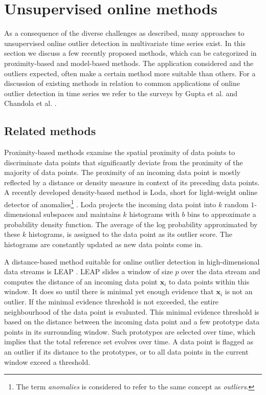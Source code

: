 \section{Unsupervised online methods}

As a consequence of the diverse challenges as described, many approaches to unsupervised online outlier detection in multivariate time series exist. In this section we discuss a few recently proposed methods, which can be categorized in proximity-based and model-based methods. The application considered and the outliers expected, often make a certain method more suitable than others. For a discussion of existing methods in relation to common applications of online outlier detection in time series we refer to the surveys by Gupta et al. \cite{gupta2014outlier} and Chandola et al. \cite{chandola2009anomaly}. 

\subsection{Related methods}
\label{sec:introduction_related}
Proximity-based methods examine the spatial proximity of data points to discriminate data points that significantly deviate from the proximity of the majority of data points. The proximity of an incoming data point is mostly reflected by a distance or density measure in context of its preceding data points.
A recently developed density-based method is Loda, short for light-weight online detector of anomalies\footnote{The term \textit{anomalies} is considered to refer to the same concept as \textit{outliers}.} \cite{pevny2016loda}. Loda projects the incoming data point into $k$ random $1$-dimensional subspaces and maintains $k$ histograms with $b$ bins to approximate a probability density function. The average of the log probability approximated by these $k$ histograms, is assigned to the data point as its outlier score. The histograms are constantly updated as new data points come in. 

A distance-based method suitable for online outlier detection in high-dimensional data streams is LEAP \cite{cao2014scalable}. LEAP slides a window of size $p$ over the data stream and computes the distance of an incoming data point $\mathbf{x}_i$ to data points within this window. It does so until there is minimal yet enough evidence that $\mathbf{x}_i$ is not an outlier. If the minimal evidence threshold is not exceeded, the entire neighbourhood of the data point is evaluated. This minimal evidence threshold is based on the distance between the incoming data point and a few prototype data points in its surrounding window. Such prototypes are selected over time, which implies that the total reference set evolves over time. A data point is flagged as an outlier if its distance to the prototypes, or to all data points in the current window exceed a threshold.

